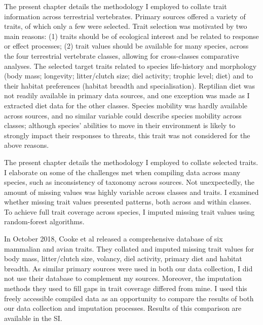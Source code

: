 The present chapter details the methodology I employed to collate trait information across terrestrial vertebrates. Primary sources offered a variety of traits, of which only a few were selected. Trait selection was motivated by two main reasons: (1) traits should be of ecological interest and be related to response or effect processes; (2) trait values should be available for many species, across the four terrestrial vertebrate classes, allowing for cross-classes comparative analyses. The selected target traits related to species life-history and morphology (body mass; longevity; litter/clutch size; diel activity; trophic level; diet) and to their habitat preferences (habitat breadth and specialisation). Reptilian diet was not readily available in primary data sources, and one exception was made as I extracted diet data for the other classes. Species mobility was hardly available across sources, and no similar variable could describe species mobility across classes; although species' abilities to move in their environment is likely to strongly impact their responses to threats, this trait was not considered for the above reasons. 

The present chapter details the methodology I employed to collate selected traits. I elaborate on some of the challenges met when compiling data across many species, such as inconsistency of taxonomy across sources. Not unexpectedly, the amount of missing values was highly variable across classes and traits. I examined whether missing trait values presented patterns, both across and within classes. To achieve full trait coverage across species, I imputed missing trait values using random-forest algorithms. 

In October 2018, Cooke et al released a comprehensive database of six mammalian and avian traits. They collated and imputed missing trait values for body mass, litter/clutch size, volancy, diel activity, primary diet and habitat breadth. As similar primary sources were used in both our data collection, I did not use their database to complement my sources. Moreover, the imputation methods they used to fill gaps in trait coverage differed from mine. I used this freely accessible compiled data as an opportunity to compare the results of both our data collection and imputation processes. Results of this comparison are available in the SI.



